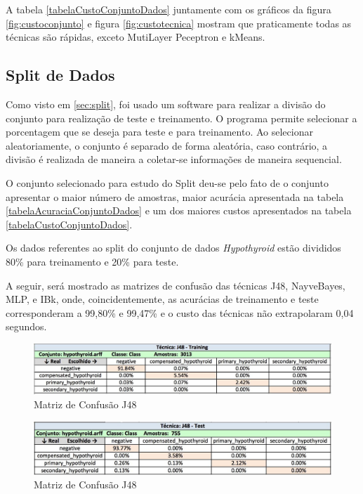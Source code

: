 \documentclass[12pt]{article}
\begin{document}
A tabela \ref{tabelaCustoConjuntoDados} juntamente com os gráficos da figura \ref{fig:custoconjunto} e figura \ref{fig:custotecnica} mostram que praticamente todas as técnicas são rápidas, exceto MutiLayer Peceptron e kMeans.

\subsection{Split de Dados} \label{sec:splitdados}

Como visto em \ref{sec:split}, foi usado um software para realizar a divisão do conjunto para realização de teste e treinamento. O programa permite selecionar a porcentagem que se deseja para teste e para treinamento. Ao selecionar aleatoriamente, o conjunto é separado de forma aleatória, caso contrário, a divisão é realizada de maneira a coletar-se informações de maneira sequencial.

O conjunto selecionado para estudo do Split deu-se pelo fato de o conjunto apresentar o maior número de amostras, maior acurácia apresentada na tabela \ref{tabelaAcuraciaConjuntoDados} e um dos maiores custos apresentados na tabela \ref{tabelaCustoConjuntoDados}.

Os dados referentes ao split do conjunto de dados \textit{Hypothyroid} estão divididos 80\% para treinamento e 20\% para teste.

A seguir, será mostrado as matrizes de confusão das técnicas J48, NayveBayes, MLP,  e IBk, onde, coincidentemente, as acurácias de treinamento e teste corresponderam a 99,80\% e 99,47\% e o custo das técnicas não extrapolaram 0,04 segundos.

\begin{figure}[!h]
\centering
\includegraphics[width=.88\textwidth]{trainj48.png}
\caption{Matriz de Confusão J48}
\label{fig:trainj48}
\end{figure}

\begin{figure}[!h]
\centering
\includegraphics[width=.88\textwidth]{teste-j48.png}
\caption{Matriz de Confusão J48}
\label{fig:testJ48}
\end{figure}
\end{document}
